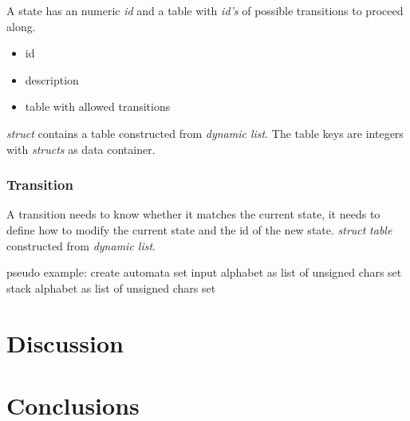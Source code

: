 \documentclass[a4paper,11pt,twoside]{article}
\begin{document}
A state has an numeric \textit{id} and a table with \textit{id's} of possible
transitions to proceed along. 

\begin{itemize}
\item id
\item description
\item table with allowed transitions
\end{itemize}

\textit{struct} contains a table constructed from \textit{dynamic
  list}. The table keys are integers with \textit{structs} as data
container. 


\subsubsection{Transition}
A transition needs to know whether it matches the current
state, it needs to define how to modify the current state and the id
of the new state. 
\textit{struct} 
\textit{table} constructed from \textit{dynamic list}. 

pseudo example:
create automata
set input alphabet as list of unsigned chars
set stack alphabet as list of unsigned chars
set 

\section{Discussion}

\section{Conclusions}


\end{document}
